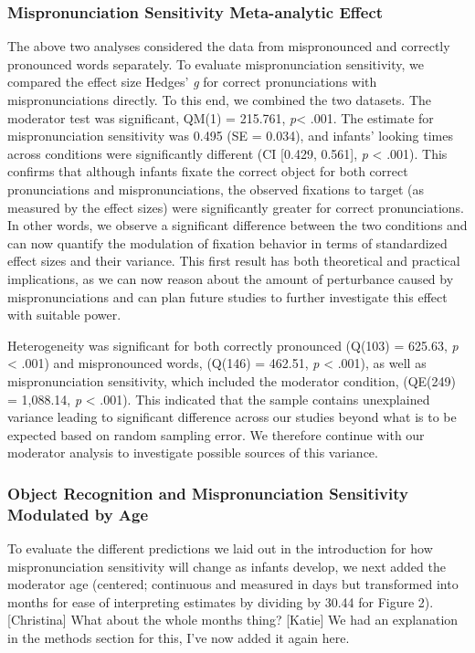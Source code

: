\documentclass[man]{apa6}
\theoremstyle{definition}
\theoremstyle{definition}
\theoremstyle{definition}
\theoremstyle{remark}
\begin{document}
\subsubsection{Mispronunciation Sensitivity Meta-analytic
Effect}\label{mispronunciation-sensitivity-meta-analytic-effect}

The above two analyses considered the data from mispronounced and
correctly pronounced words separately. To evaluate mispronunciation
sensitivity, we compared the effect size Hedges' \emph{g} for correct
pronunciations with mispronunciations directly. To this end, we combined
the two datasets. The moderator test was significant, QM(1) = 215.761,
\emph{p}\textless{} .001. The estimate for mispronunciation sensitivity
was 0.495 (SE = 0.034), and infants' looking times across conditions
were significantly different (CI {[}0.429, 0.561{]}, \emph{p}
\textless{} .001). This confirms that although infants fixate the
correct object for both correct pronunciations and mispronunciations,
the observed fixations to target (as measured by the effect sizes) were
significantly greater for correct pronunciations. In other words, we
observe a significant difference between the two conditions and can now
quantify the modulation of fixation behavior in terms of standardized
effect sizes and their variance. This first result has both theoretical
and practical implications, as we can now reason about the amount of
perturbance caused by mispronunciations and can plan future studies to
further investigate this effect with suitable power.

Heterogeneity was significant for both correctly pronounced (Q(103) =
625.63, \emph{p} \textless{} .001) and mispronounced words, (Q(146) =
462.51, \emph{p} \textless{} .001), as well as mispronunciation
sensitivity, which included the moderator condition, (QE(249) =
1,088.14, \emph{p} \textless{} .001). This indicated that the sample
contains unexplained variance leading to significant difference across
our studies beyond what is to be expected based on random sampling
error. We therefore continue with our moderator analysis to investigate
possible sources of this variance.

\subsubsection{Object Recognition and Mispronunciation Sensitivity
Modulated by
Age}\label{object-recognition-and-mispronunciation-sensitivity-modulated-by-age}

To evaluate the different predictions we laid out in the introduction
for how mispronunciation sensitivity will change as infants develop, we
next added the moderator age (centered; continuous and measured in days
but transformed into months for ease of interpreting estimates by
dividing by 30.44 for Figure 2). {[}Christina{]} What about the whole
months thing? {[}Katie{]} We had an explanation in the methods section
for this, I've now added it again here.
\end{document}
